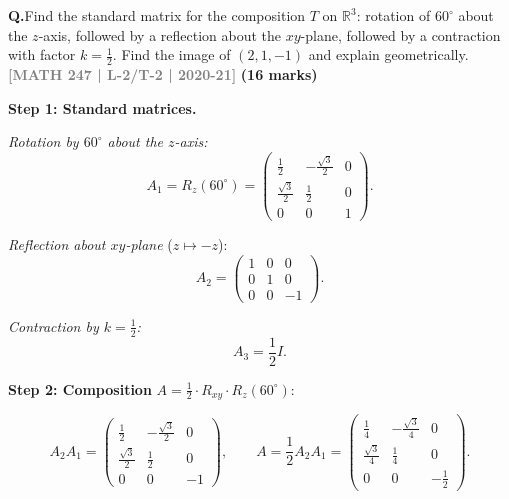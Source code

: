 \documentclass[12pt,a3paper]{article}
\newcommand{\yr}[1]{\hfill\textcolor{gray}{\small\textbf{[#1]}}}
\newcommand{\mk}[1]{\textcolor{orange!70!black}{\small\textbf{(#1 marks)}}}
\newcounter{qnum}
\newcommand{\Q}[1]{%
  \needspace{4\baselineskip}
  \refstepcounter{qnum}
  \vspace{6pt}
  \noindent\textbf{Q\theqnum.}\enspace #1\par
}
\begin{document}
\Q{Find the standard matrix for the composition $T$ on $\mathbb{R}^3$: rotation of $60^\circ$ about the $z$-axis, followed by a reflection about the $xy$-plane, followed by a contraction with factor $k = \frac{1}{2}$. Find the image of $(2,1,-1)$ and explain geometrically.
\yr{MATH 247 | L-2/T-2 | 2020-21} \mk{16}}


\begin{tcolorbox}[enhanced,breakable,
  colback=cF!4,colframe=cF,boxrule=0.8pt,arc=5pt,
  title={\textbf{Answer --- Composition: Rot$(60^\circ,z)$ $\to$ Reflect$(xy)$ $\to$ Contraction$(\frac{1}{2})$; $T(2,1,-1)$}},
  fonttitle=\bfseries\color{white},colbacktitle=cF]

\textbf{Step 1: Standard matrices.}

\textit{Rotation by $60^\circ$ about the $z$-axis:}
\[
A_1=R_z(60^\circ)=\begin{pmatrix}\frac{1}{2}&-\frac{\sqrt{3}}{2}&0\\\frac{\sqrt{3}}{2}&\frac{1}{2}&0\\0&0&1\end{pmatrix}.
\]

\textit{Reflection about $xy$-plane} ($z\mapsto -z$):
\[
A_2=\begin{pmatrix}1&0&0\\0&1&0\\0&0&-1\end{pmatrix}.
\]

\textit{Contraction by $k=\tfrac{1}{2}$:}
\[
A_3=\frac{1}{2}I.
\]

\textbf{Step 2: Composition} $A=\frac{1}{2}\cdot R_{xy}\cdot R_z(60^\circ)$:

\[
A_2A_1=\begin{pmatrix}\frac{1}{2}&-\frac{\sqrt{3}}{2}&0\\\frac{\sqrt{3}}{2}&\frac{1}{2}&0\\0&0&-1\end{pmatrix},
\qquad
A=\frac{1}{2}A_2A_1=\begin{pmatrix}\frac{1}{4}&-\frac{\sqrt{3}}{4}&0\\[4pt]\frac{\sqrt{3}}{4}&\frac{1}{4}&0\\0&0&-\frac{1}{2}\end{pmatrix}.
\]


\end{tcolorbox}
\end{document}

